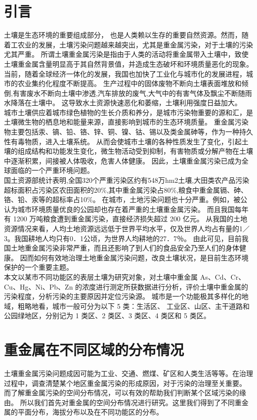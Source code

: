 \documentclass[a4paper]{article}
\begin{document}
\part{引言}
土壤是生态环境的重要组成部分， 也是人类赖以生存的重要自然资源。然而，随着工农业的发展，土壤污染问题越来越突出，尤其是重金属污染，对于土壤的污染尤其严重。
所谓土壤重金属污染是指由于人类的活动将重金属带入土壤中，致使土壤重金属含量明显高于其自然背景值，并造成生态破坏和环境质量恶化的现象。
当前，随着全球经济一体化的发展，我国也加快了工业化与城市化的发展进程，城市的农业集约化程度不断提高。
生产过程中的固体废物不断向土壤表面堆放和倾倒,有害废水不断向土壤中渗透,汽车排放的废气,大气中的有害气体及飘尘不断随雨水降落在土壤中。
这导致水土资源快速恶化和萎缩，土壤利用强度日益加大。   \\
\indent 城市土壤供应着城市绿色植物的生长介质和养分，是城市污染物重要的源和汇，是土壤微生物的栖息地和能量来源，直接影响到城市的生态环境质量。
重金属污染物主要包括汞、镐、铅、铬、锌、铜、镍、钴、锡以及类金属砷等，作为一种持久性有毒物质，进入土壤系统。
从而会使城市土壤的各种性质发生了变化，引起土壤的组成结构和功能发生变化，微生物活动受到抑制，有害物质或分解产物在土壤中逐渐积累，间接被人体吸收，危害人体健康。
因此，土壤重金属污染已成为全球面临的一个严重环境问题。   \\
\indent 国土资源部统计表明,全国320个严重污染区约有548万hm2土壤,大田类农产品污染超标面积占污染区农田面积的20\%,其中重金属污染占80\%,粮食中重金属镉、砷、铬、铅、汞等的超标率占10\%。
在城市，土地污染问题也十分严重。例如，被公认为城市环境质量优良的公园却也存在着严重的土壤重金属污染。
而且我国每年有 1200 万吨粮食遭到重金属污染，直接经济损失超过 200 亿元。
从我国的土地资源情况来看，人均土地资源远远低于世界平均水平，仅及世界人均占有量的1／3。我国耕地人均只有0．1公顷，为世界人均耕地的27．7％。
由此可见，目前我国土地重金属污染非常严重，而且还影响了到人们的食品安全乃至人们的身体健康。
因而如何有效地治理土地重金属污染问题，改良土壤状况，是目前生态环境保护的一个重要主题。    \\
\indent 本文以某市不同功能区的表层土壤为研究对象，对土壤中重金属 As、Cd、Cr、
Cu、Hg、Ni、Pb、Zn 的浓度进行测定所获数据进行分析，评价土壤中重金属的污染程度，分析污染的主要原因并定位污染源。
城市是一个功能极其多样化的地域，粗略地看，城市一般可分为以下 5 类：生活区、
工业区、山区、主干道路和公园绿地区，分别记为 1 类区、2 类区、3 类区、4 类区和 5
类区。



\part{重金属在不同区域的分布情况}
\indent 土壤重金属污染问题成因可能为工业、交通、燃煤、矿区和人类生活等等。在治理过程中，调查清楚某个地区重金属污染的形成原因，对于污染的治理至关重要。
而了解重金属污染的空间分布情况，可以有效的帮助我们判断某个区域污染的缘由。
所以我们首先对重金属的空间分布情况进行研究。这里我们得到了不同重金属的平面分布，海拔分布以及在不同功能区的分布。   \\
\end{document}
